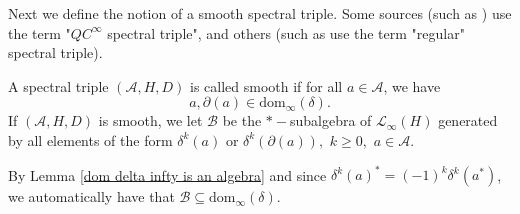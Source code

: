     
    Next we define the notion of a smooth spectral triple. Some sources (such as \cite[Definition 3.18]{CGRS2}) use the term "$QC^{\infty}$ spectral triple", and others (such as \cite[Definition 4.25]{higson} use the term "regular" spectral triple).
    \begin{defi}\label{smoothness definition}
        A spectral triple $(\mathcal{A},H,D)$ is called smooth if for all $a \in \mathcal{A}$, we have
        \begin{equation*}
            a, \partial(a) \in \mathrm{dom}_\infty(\delta).
        \end{equation*}
        If $(\mathcal{A},H,D)$ is smooth, we let $\mathcal{B}$ be the $*-$subalgebra of $\mathcal{L}_\infty(H)$ generated by all elements of the form $\delta^k(a)$ or $\delta^k(\partial(a)),$ $k\geq0,$ $a\in\mathcal{A}.$
    \end{defi}
    By Lemma \ref{dom delta infty is an algebra} and since $\delta^k(a)^* = (-1)^k\delta^k(a^*)$, we automatically have that $\mathcal{B} \subseteq \mathrm{dom}_\infty(\delta)$.
    

